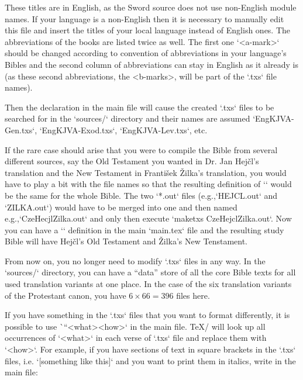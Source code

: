 These titles are in English, as the Sword source does not use non-English module names. 
If your language is a non-English then it is necessary to manually edit this file and insert the titles of your local language instead of English ones.
The abbreviations of the books are listed twice as well. The first one `<a-mark>` should be changed according to convention of abbreviations in your language's Bibles and the second column of abbreviations can stay in English as it already is (as these second abbreviations, the <b-marks>, will be part of the `.txs` file names).  

Then the declaration 
\begtt
\def\txsfile {sources/Eng\tmark-\bmark.txs}
\endtt
in the main file will cause the created `.txs` files to be searched for 
in the `sources/` directory and their names are assumed
`EngKJVA-Gen.txs`, `EngKJVA-Exod.txs`, `EngKJVA-Lev.txs`, etc.

If the rare case should arise that you were to compile the Bible from several different sources, say the Old Testament you wanted in Dr. Jan Hejčl's translation and the New Testament in František Žilka's translation, you would have to play a bit with the file names so that the resulting definition of `\tmark` would be the same for the whole Bible. The two `*.out` files (e.g.,`HEJCL.out` and `ZILKA.out`) would have to be merged into one and then named e.g.,`CzeHecjlZilka.out` and  only then execute `maketxs CzeHejclZilka.out`.  Now you can have a `\def\tmark{HejclZilka}` definition in the main `main.tex` file and 
the resulting study Bible will have Hejčl's Old Testament and Žilka's New Tenstament.




From now on, you no longer need to modify  `.txs` files in any way.
In the `sources/` directory, you can have a “data” store of all the core Bible texts for all used translation variants at one place. In the case of the six translation variants
of the Protestant canon, you have $6 \times 66=396$ files here.



If you have something in the `.txs` files that you want to format differently, it is 
possible to use \`\cnvtext``{<what>}{<how>}` in the main file. 
\TeX/  will look up all occurrences of `<what>` in each verse of `.txs` file and replace them with `<how>`.
For example, if you have sections of text in square brackets in the `.txs` files, i.e.
`[something like this]` and you want to print them in italics, write in the main file:
\begtt
\cnvtext{[}{\bgroup\it} \cnvtext{]}{\/\egroup}
\endtt

